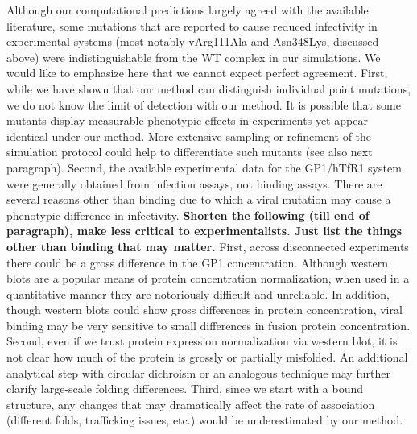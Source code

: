 \documentclass[12pt]{article}
\begin{document}
Although our computational predictions largely agreed with the available literature, some mutations that are reported to cause reduced infectivity in experimental systems (most notably vArg111Ala and Asn348Lys, discussed above) were indistinguishable from the WT complex in our simulations. We would like to emphasize here that we cannot expect perfect agreement. First, while we have shown that our method can distinguish individual point mutations, we do not know the limit of detection with our method. It is possible that some mutants display measurable phenotypic effects in experiments yet appear identical under our method. More extensive sampling or refinement of the simulation protocol could help to differentiate such mutants (see also next paragraph). Second, the available experimental data for the GP1/hTfR1 system were generally obtained from infection assays, not binding assays. There are several reasons other than binding due to which a viral mutation may cause a phenotypic difference in infectivity. \textbf{Shorten the following (till end of paragraph), make less critical to experimentalists. Just list the things other than binding that may matter.} First, across disconnected experiments there could be a gross difference in the GP1 concentration. Although western blots are a popular means of protein concentration normalization, when used in a quantitative manner they are notoriously difficult and unreliable. In addition, though western blots could show gross differences in protein concentration, viral binding may be very sensitive to small differences in fusion protein concentration.  Second, even if we trust protein expression normalization via western blot, it is not clear how much of the protein is grossly or partially misfolded. An additional analytical step with circular dichroism or an analogous technique may further clarify large-scale folding differences. Third, since we start with a bound structure, any changes that may dramatically affect the rate of association (different folds, trafficking issues, etc.) would be underestimated by our method.
\end{document}
